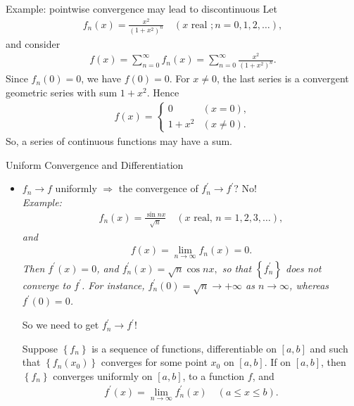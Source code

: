 \documentclass[10pt,xcolor=table,dvipsnames]{beamer}
\begin{document}
\begin{frame}{Example: pointwise convergence may lead to discontinuous}
Let
\begin{align*}
f_n(x)=\frac{x^2}{\left(1+x^2\right)^n} \quad(x \text { real } ; n=0,1,2, \ldots),
\end{align*}
and consider
\begin{align*}
f(x)=\sum_{n=0}^{\infty} f_n(x)=\sum_{n=0}^{\infty} \frac{x^2}{\left(1+x^2\right)^n} .
\end{align*}
Since $f_n(0)=0$, we have $f(0)=0$. For $x \neq 0$, the last series is a convergent geometric series with sum $1+x^2$. Hence
\begin{align*}
f(x)= \begin{cases}0 & (x=0), \\ 1+x^2 & (x \neq 0).\end{cases}
\end{align*}
{\small So, a  series of continuous functions may have a  sum.}    
\end{frame}

\begin{frame}{Uniform Convergence and Differentiation}
\begin{itemize}
    \item $f_n \rightarrow f$ uniformly $\Rightarrow$ the convergence of $f_n^{\prime} \rightarrow f^{\prime}$?  No! \\
    \pause
\emph{\small Example: 
\begin{align*}
f_n(x)=\frac{\sin n x}{\sqrt{n}} \quad(x \text { real, } n=1,2,3, \ldots),
\end{align*}
and
\begin{align*}
f(x)=\lim _{n \rightarrow \infty} f_n(x)=0 .
\end{align*}
Then $f^{\prime}(x)=0$, and
$f_n^{\prime}(x)=\sqrt{n} \cos n x,$
so that $\left\{f_n^{\prime}\right\}$ does not converge to $f^{\prime}$. For instance, $f_n^{\prime}(0)=\sqrt{n} \rightarrow+\infty$ as $n \rightarrow \infty$, whereas $f^{\prime}(0)=0$.}
\pause

So we need  to get $f_n^{\prime} \rightarrow f^{\prime}$!
\pause

\begin{Theorem}
    Suppose $\left\{f_n\right\}$ is a sequence of functions, differentiable on $[a, b]$ and such that $\left\{f_n\left(x_0\right)\right\}$ converges for some point $x_0$ on $[a, b]$. If  on $[a, b]$, then $\left\{f_n\right\}$ converges uniformly on $[a, b]$, to a function $f$, and
\begin{align*}
f^{\prime}(x)=\lim _{n \rightarrow \infty} f_n^{\prime}(x) \quad(a \leq x \leq b) .
\end{align*}
\end{Theorem}  

\end{itemize}
\end{frame}
\end{document}

